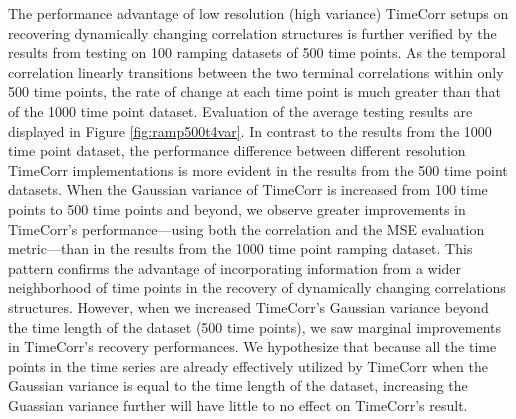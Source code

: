 \documentclass[11pt]{article}
\begin{document}
The performance advantage of low resolution (high variance) TimeCorr setups on recovering dynamically changing correlation structures is further verified by the results from testing on 100 ramping datasets of 500 time points. As the temporal correlation linearly transitions between the two terminal correlations within only 500 time points, the rate of change at each time point is much greater than that of the 1000 time point dataset. Evaluation of the average testing results are displayed in Figure \ref{fig:ramp500t4var}. In contrast to the results from the 1000 time point dataset, the performance difference between different resolution TimeCorr implementations is more evident in the results from the 500 time point datasets. When the Gaussian variance of TimeCorr is increased from 100 time points to 500 time points and beyond, we observe greater improvements in TimeCorr's performance---using both the correlation and the MSE evaluation metric---than in the results from the 1000 time point ramping dataset. This pattern confirms the advantage of incorporating information from a wider neighborhood of time points in the recovery of dynamically changing correlations structures. However, when we increased TimeCorr's Gaussian variance beyond the time length of the dataset (500 time points), we saw marginal improvements in TimeCorr's recovery performances. We hypothesize that because all the time points in the time series are already effectively utilized by TimeCorr when the Gaussian variance is equal to the time length of the dataset, increasing the Guassian variance further will have little to no effect on TimeCorr's result.
\end{document}
